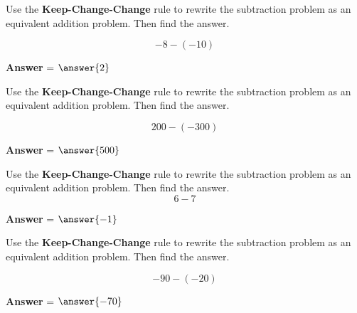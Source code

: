 \documentclass[font=12pt, handout]{ximera}
\begin{document}
\begin{problem} 
    Use the \textbf{Keep-Change-Change} rule to rewrite the subtraction problem as an equivalent addition problem. Then find the answer.

    \[ -8 - (-10) \]

\begin{multipleChoice}
\end{multipleChoice}


\textcolor{accessibleOrange}{\textbf{Answer}} = $\answer{2}$ 

\end{problem}





\begin{problem}
Use the \textbf{Keep-Change-Change} rule to rewrite the subtraction problem as an equivalent addition problem. Then find the answer.

    \[ 200 - (-300) \]

\begin{multipleChoice}
\end{multipleChoice}

\textcolor{accessibleOrange}{\textbf{Answer}} = $\answer{500}$
\end{problem}

\begin{problem}
Use the \textbf{Keep-Change-Change} rule to rewrite the subtraction problem as an equivalent addition problem. Then find the answer.
\[ 6 - 7 \]

\begin{multipleChoice}
\end{multipleChoice}

\textcolor{accessibleOrange}{\textbf{Answer}} = $\answer{-1}$
\end{problem}


\begin{problem}
Use the \textbf{Keep-Change-Change} rule to rewrite the subtraction problem as an equivalent addition problem. Then find the answer.

    \[ -90 - (-20) \]

\begin{multipleChoice}
\end{multipleChoice}

\textcolor{accessibleOrange}{\textbf{Answer}} = $\answer{-70}$

\end{problem}
\end{document}
